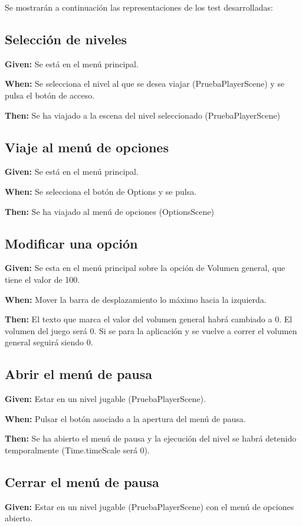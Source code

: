 Se mostrarán a continuación las representaciones de los test desarrolladas:

\subsection{Selección de niveles}
\textbf{Given:} Se está en el menú principal.

\textbf{When:} Se selecciona el nivel al que se desea viajar (PruebaPlayerScene) y se pulsa el botón de acceso.

\textbf{Then:} Se ha viajado a la escena del nivel seleccionado (PruebaPlayerScene)

\subsection{Viaje al menú de opciones}
\textbf{Given:} Se está en el menú principal.

\textbf{When:} Se selecciona el botón de Options y se pulsa.

\textbf{Then:} Se ha viajado al menú de opciones (OptionsScene)

\subsection{Modificar una opción}
\textbf{Given:} Se esta en el menú principal sobre la opción de Volumen general, que tiene el valor de 100.

\textbf{When:} Mover la barra de desplazamiento lo máximo hacia la izquierda.

\textbf{Then:} El texto que marca el valor del volumen general habrá cambiado a 0. El volumen del juego será 0. Si se para la aplicación y se vuelve a correr el volumen general seguirá siendo 0.

\subsection{Abrir el menú de pausa}
\textbf{Given:} Estar en un nivel jugable (PruebaPlayerScene).

\textbf{When:} Pulsar el botón asociado a la apertura del menú de pausa.

\textbf{Then:} Se ha abierto el menú de pausa y la ejecución del nivel se habrá detenido temporalmente (Time.timeScale será 0).

\subsection{Cerrar el menú de pausa}
\textbf{Given:} Estar en un nivel jugable (PruebaPlayerScene) con el menú de opciones abierto.


